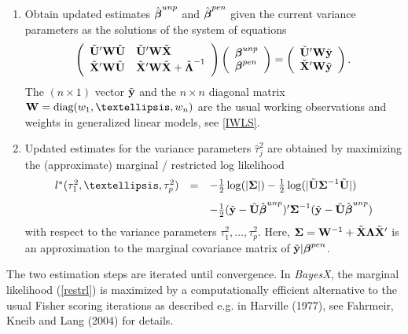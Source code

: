\documentclass[11pt,a4paper,twoside]{bayesxarticle}
\begin{document}
\begin{enumerate}
\item Obtain updated estimates $\hat{\boldsymbol{\beta}}^{unp}$ and $\hat{\boldsymbol{\beta}}^{pen}$ given the current variance parameters
as the solutions of the system of equations
\begin{equation}
\label{equsystem} \left(
\begin{array}{ll}
\tilde{\Uvec}' \Wvec  \tilde{\Uvec} & \tilde{\Uvec}' \Wvec  \tilde{\Xvec} \\
\tilde{\Xvec}' \Wvec  \tilde{\Uvec} & \tilde{\Xvec}' \Wvec  \tilde{\Xvec} +
\tilde{\Lambdavec}^{-1}
\end{array}
\right) \left(
\begin{array}{l}
\betavec^{unp} \\
\betavec^{pen}
\end{array}
\right) = \left(
\begin{array}{l}
\tilde{\Uvec}' \Wvec \tilde{\yvec} \\
\tilde{\Xvec}'\Wvec \tilde{\yvec}
\end{array}
\right).
\end{equation}
The $(n \times 1)$ vector $\tilde{\mathbf{y}}$ and the $n \times n$ diagonal
matrix $\Wvec = \diag(w_1,\dots,w_n)$ are the usual working observations
and weights in generalized linear models, see \autoref{IWLS}.
\item Updated estimates for the variance parameters $\hat{\tau}_j^2$ are obtained by maximizing
the (approximate) marginal / restricted log likelihood
\begin{equation}
\label{restrl}
\begin{array}{lll}
l^{\ast}(\tau^2_1,\dots,\tau^2_p) & = & -\frac{1}{2}
\log(|\Sigmavec|) - \frac{1}{2} \log(|\tilde{\Uvec} \Sigmavec^{-1}
\tilde{\Uvec}|) \\ [0.3cm] & & - \frac{1}{2} (\tilde{\yvec} - \tilde{\Uvec}
\hat{\betavec}^{unp})' \Sigmavec^{-1} (\tilde{\yvec} - \tilde{\Uvec}
\hat{\betavec}^{unp})
\end{array}
\end{equation}
with respect to the variance parameters $\tau^2_1,\dots,\tau^2_p$.
Here, $\boldsymbol{\Sigma} = \mathbf{W}^{-1} + \tilde{\mathbf{X}} \boldsymbol{\Lambda} \tilde{\mathbf{X}}'$ is an
approximation to the marginal covariance matrix of $\tilde{\mathbf{y}} |
\boldsymbol{\beta}^{pen}$.
\end{enumerate}

The two estimation steps are iterated until convergence. In {\em
BayesX}, the marginal likelihood (\ref{restrl}) is maximized by a
computationally efficient alternative to the usual Fisher scoring
iterations as described e.g. in Harville (1977), see Fahrmeir, Kneib
and Lang (2004) for details.
\end{document}
